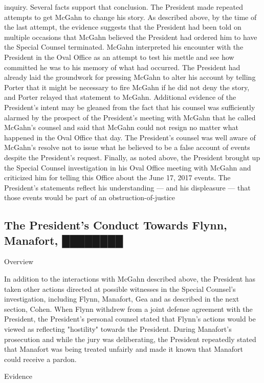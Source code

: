inquiry.
Several facts support that conclusion.
The President made repeated attempts to get McGahn to change his story.
As described above, by the time of the last attempt, the evidence suggests that the President had been told on multiple occasions that McGahn believed the President had ordered him to have the Special Counsel terminated.
McGahn interpreted his encounter with the President in the Oval Office as an attempt to test his mettle and see how committed he was to his memory of what had occurred.
The President had already laid the groundwork for pressing McGahn to alter his account by telling Porter that it might be necessary to fire McGahn if he did not deny the story, and Porter relayed that statement to McGahn.
Additional evidence of the President's intent may be gleaned from the fact that his counsel was sufficiently alarmed by the prospect of the President's meeting with McGahn that he called McGahn's counsel and said that McGahn could not resign no matter what happened in the Oval Office that day.
The President's counsel was well aware of McGahn's resolve not to issue what he believed to be a false account of events despite the President's request.
Finally, as noted above, the President brought up the Special Counsel investigation in his Oval Office meeting with McGahn and criticized him for telling this Office about the June 17, 2017 events.
The President's statements reflect his understanding — and his displeasure — that those events would be part of an obstruction-of-justice

\subsection{The President's Conduct Towards Flynn, Manafort, ████████}

Overview

In addition to the interactions with McGahn described above, the President has taken other actions directed at possible witnesses in the Special Counsel's investigation, including Flynn, Manafort, Gea and as described in the next section, Cohen.
When Flynn withdrew from a joint defense agreement with the President, the President's personal counsel stated that Flynn's actions would be viewed as reflecting "hostility" towards the President.
During Manafort's prosecution and while the jury was deliberating, the President repeatedly stated that Manafort was being treated unfairly and made it known that Manafort could receive a pardon.

Evidence

